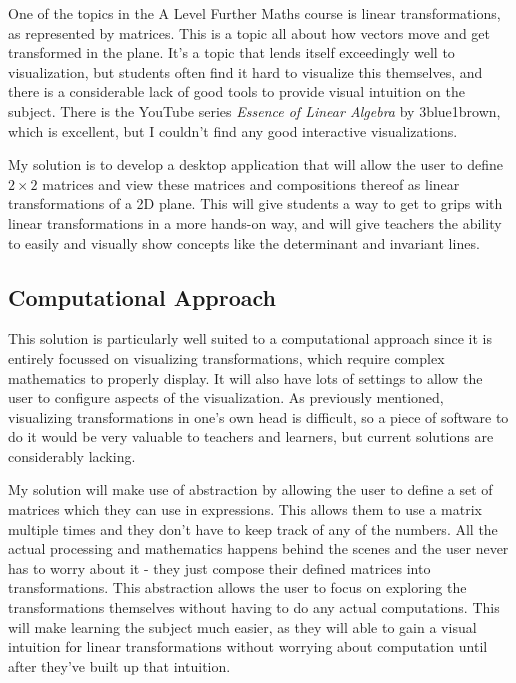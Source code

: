 \documentclass[../main.tex]{subfiles}
\begin{document}
One of the topics in the A Level Further Maths course is linear transformations, as represented by matrices. This is a topic all about how vectors move and get transformed in the plane. It's a topic that lends itself exceedingly well to visualization, but students often find it hard to visualize this themselves, and there is a considerable lack of good tools to provide visual intuition on the subject. There is the YouTube series \textit{Essence of Linear Algebra} by 3blue1brown\cite{essence-of-linear-algebra}, which is excellent, but I couldn't find any good interactive visualizations.

My solution is to develop a desktop application that will allow the user to define $2 \times 2$ matrices and view these matrices and compositions thereof as linear transformations of a 2D plane. This will give students a way to get to grips with linear transformations in a more hands-on way, and will give teachers the ability to easily and visually show concepts like the determinant and invariant lines.

\subsection{Computational Approach\label{analysis:computational-approach}}

This solution is particularly well suited to a computational approach since it is entirely focussed on visualizing transformations, which require complex mathematics to properly display. It will also have lots of settings to allow the user to configure aspects of the visualization. As previously mentioned, visualizing transformations in one's own head is difficult, so a piece of software to do it would be very valuable to teachers and learners, but current solutions are considerably lacking.

My solution will make use of abstraction by allowing the user to define a set of matrices which they can use in expressions. This allows them to use a matrix multiple times and they don't have to keep track of any of the numbers. All the actual processing and mathematics happens behind the scenes and the user never has to worry about it - they just compose their defined matrices into transformations. This abstraction allows the user to focus on exploring the transformations themselves without having to do any actual computations. This will make learning the subject much easier, as they will able to gain a visual intuition for linear transformations without worrying about computation until after they've built up that intuition.
\end{document}
